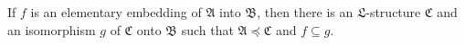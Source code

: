 If $f$ is an elementary embedding of $\mathfrak{A}$ into $\mathfrak{B}$, then there is an $\mathfrak{L}$-structure $\mathfrak{C}$ and an isomorphism $g$ of $\mathfrak{C}$ onto $\mathfrak{B}$ such that $\mathfrak{A} \preceq \mathfrak{C}$ and $f \subseteq g$.
